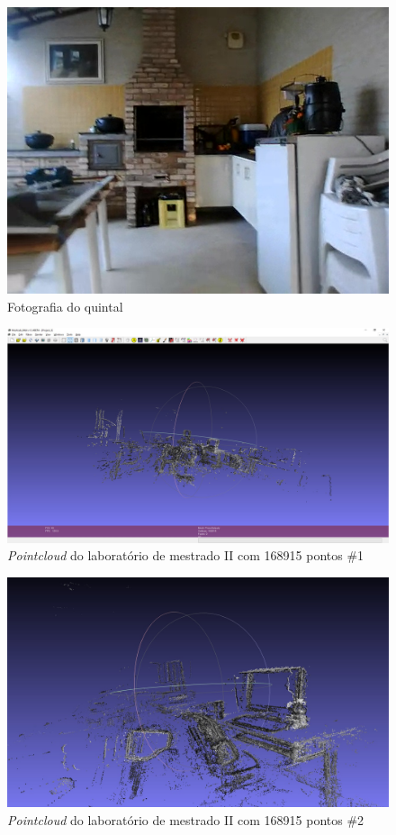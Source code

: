 \begin{figure}[H]
	\centering
		\includegraphics[width= \textwidth]{Imagens/figura4-12.jpg}
	\caption{Fotografia do quintal}
	\label{fig4:12}
\end{figure}


\begin{figure}[H]
	\centering
		\includegraphics[width= \textwidth]{Imagens/figura4-13.jpg}
	\caption{\textit{Pointcloud} do laboratório de mestrado II com 168915 pontos \#1}
	\label{fig4:13}
\end{figure}

\begin{figure}[H]
	\centering
		\includegraphics[width= \textwidth]{Imagens/figura4-14.jpg}
	\caption{\textit{Pointcloud} do laboratório de mestrado II com 168915 pontos \#2}
	\label{fig4:14}
\end{figure}

